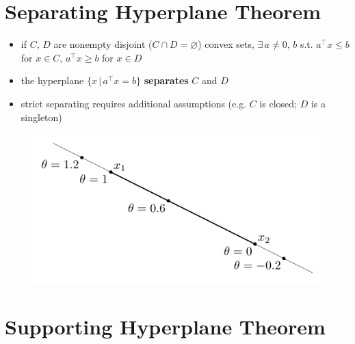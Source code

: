 \documentclass[11pt]{extarticle}
\newcommand{\ds}{\displaystyle}
\theoremstyle{definition}
\begin{document}
\section*{Separating Hyperplane Theorem}
\begin{itemize}
  \item if $C$, $D$ are nonempty disjoint ($C\cap D=\varnothing$) convex sets, $\exists\,a\ne 0$, $b$ s.t. $\ds a^\top x\leqslant b$ for $x\in C$, $a^\top x\geqslant b$ for $x\in D$ 
  \item the hyperplane $\ds\{x\,|\,a^\top x = b\}$ {\bf separates} $C$ and $D$
  \item strict separating requires additional assumptions (e.g. $C$ is closed; $D$ is a singleton)
\end{itemize}
\vspace{-10mm}
\begin{figure}[!htbp]
  \centering
  \includegraphics[scale=0.91,page=18]{fig/02.pdf}
\end{figure}

\newpage

\section*{Supporting Hyperplane Theorem}
\end{document}
